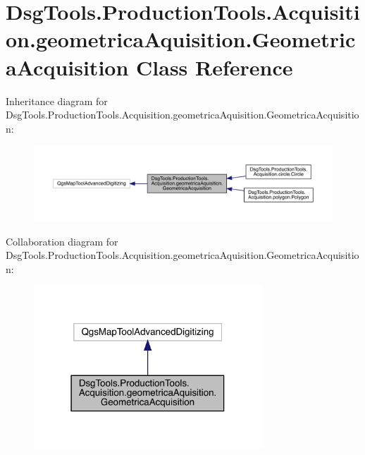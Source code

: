 \hypertarget{class_dsg_tools_1_1_production_tools_1_1_acquisition_1_1geometrica_aquisition_1_1_geometrica_acquisition}{}\section{Dsg\+Tools.\+Production\+Tools.\+Acquisition.\+geometrica\+Aquisition.\+Geometrica\+Acquisition Class Reference}
\label{class_dsg_tools_1_1_production_tools_1_1_acquisition_1_1geometrica_aquisition_1_1_geometrica_acquisition}


Inheritance diagram for Dsg\+Tools.\+Production\+Tools.\+Acquisition.\+geometrica\+Aquisition.\+Geometrica\+Acquisition\+:
\nopagebreak
\begin{figure}[H]
\begin{center}
\leavevmode
\includegraphics[width=350pt]{class_dsg_tools_1_1_production_tools_1_1_acquisition_1_1geometrica_aquisition_1_1_geometrica_acquisition__inherit__graph}
\end{center}
\end{figure}


Collaboration diagram for Dsg\+Tools.\+Production\+Tools.\+Acquisition.\+geometrica\+Aquisition.\+Geometrica\+Acquisition\+:
\nopagebreak
\begin{figure}[H]
\begin{center}
\leavevmode
\includegraphics[width=243pt]{class_dsg_tools_1_1_production_tools_1_1_acquisition_1_1geometrica_aquisition_1_1_geometrica_acquisition__coll__graph}
\end{center}
\end{figure}
